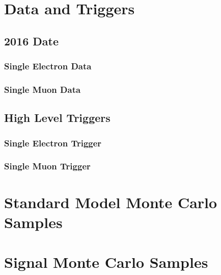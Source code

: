 \section{Data and Triggers}

\subsection{2016 Date}
\subsubsection{Single Electron Data}
\subsubsection{Single Muon Data}
\subsection{High Level Triggers}
\subsubsection{Single Electron Trigger}
\subsubsection{Single Muon Trigger}

\section{Standard Model Monte Carlo Samples}

\section{Signal Monte Carlo Samples}



